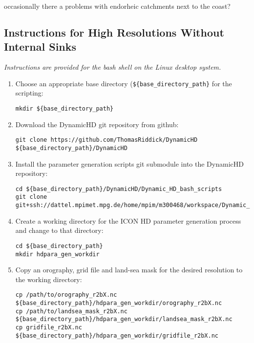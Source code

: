 \documentclass{article}
\begin{document}
occasionally there a problems with endorheic catchments next to the coast?
\subsection{Instructions for High Resolutions Without Internal Sinks}

\emph{Instructions are provided for the bash shell on the Linux desktop system.}

\begin{enumerate}

\item Choose an appropriate base directory (\lstinline[style=bash_input]|${base_directory_path}| for the scripting:
\begin{lstlisting}[style=bash_input,breaklines=true]
mkdir ${base_directory_path}
\end{lstlisting}
\item Download the DynamicHD git repository from github:
\begin{lstlisting}[style=bash_input,breaklines=true]
git clone https://github.com/ThomasRiddick/DynamicHD ${base_directory_path}/DynamicHD
\end{lstlisting}
\item Install the parameter generation scripts git submodule into the DynamicHD repository:
\begin{lstlisting}[style=bash_input,breaklines=true] 
cd ${base_directory_path}/DynamicHD/Dynamic_HD_bash_scripts
git clone git+ssh://dattel.mpimet.mpg.de/home/mpim/m300468/workspace/Dynamic_HD_Code/Dynamic_HD_bash_scripts/parameter_generation_scripts 
\end{lstlisting}
\item Create a working directory for the ICON HD parameter generation process and change to that directory:
\begin{lstlisting}[style=bash_input,breaklines=true] 
cd ${base_directory_path}
mkdir hdpara_gen_workdir
\end{lstlisting}
\item Copy an orography, grid file and land-sea mask for the desired resolution to the working directory:
\begin{lstlisting}[style=bash_input,breaklines=true] 
cp /path/to/orography_r2bX.nc ${base_directory_path}/hdpara_gen_workdir/orography_r2bX.nc 
cp /path/to/landsea_mask_r2bX.nc ${base_directory_path}/hdpara_gen_workdir/landsea_mask_r2bX.nc
cp gridfile_r2bX.nc ${base_directory_path}/hdpara_gen_workdir/gridfile_r2bX.nc
\end{lstlisting}

\end{enumerate}
\end{document}
